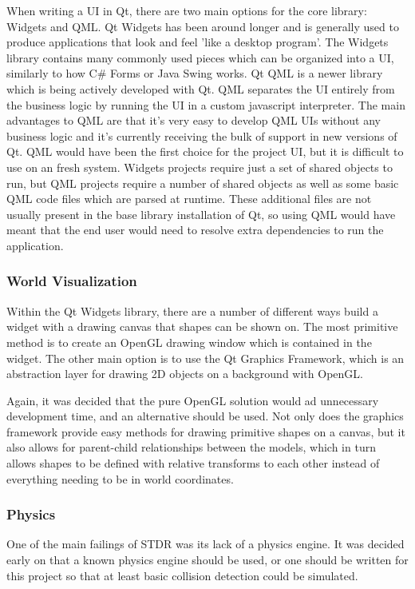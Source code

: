  	When writing a UI in Qt, there are two main options for the core library: Widgets and QML. Qt Widgets has been around longer and is generally used to produce applications that look and feel 'like a desktop program'. The Widgets library contains many commonly used pieces which can be organized into a UI, similarly to how C\# Forms or Java Swing works. Qt QML is a newer library which is being actively developed with Qt. QML separates the UI entirely from the business logic by running the UI in a custom javascript interpreter. The main advantages to QML are that it's very easy to develop QML UIs without any business logic and it's currently receiving the bulk of support in new versions of Qt. QML would have been the first choice for the project UI, but it is difficult to use on an fresh system. Widgets projects require just a set of shared objects to run, but QML projects require a number of shared objects as well as some basic QML code files which are parsed at runtime. These additional files are not usually present in the base library installation of Qt, so using QML would have meant that the end user would need to resolve extra dependencies to run the application.
 	
 	\subsubsection*{World Visualization}
 	Within the Qt Widgets library, there are a number of different ways build a widget with a drawing canvas that shapes can be shown on. The most primitive method is to create an OpenGL drawing window which is contained in the widget. The other main option is to use the Qt Graphics Framework, which is an abstraction layer for drawing 2D objects on a background with OpenGL.
 	
 	Again, it was decided that the pure OpenGL solution would ad unnecessary development time, and an alternative should be used. Not only does the graphics framework provide easy methods for drawing primitive shapes on a canvas, but it also allows for parent-child relationships between the models, which in turn allows shapes to be defined with relative transforms to each other instead of everything needing to be in world coordinates.
 	
 	\subsubsection*{Physics}
 	One of the main failings of STDR was its lack of a physics engine. It was decided early on that a known physics engine should be used, or one should be written for this project so that at least basic collision detection could be simulated.
 	
